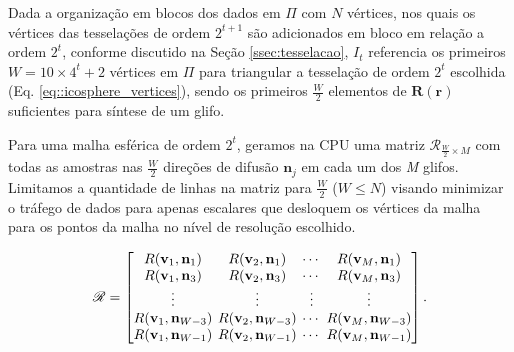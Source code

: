 Dada a organização em blocos dos dados em $\Pi$ com $N$ vértices, nos quais os vértices das tesselações de ordem $2^{t+1}$ são adicionados em bloco em relação a ordem $2^t$, conforme discutido na Seção \ref{ssec:tesselacao}, $I_t$ referencia os primeiros $W = 10 \times 4^t + 2$ vértices em $\Pi$ para triangular a tesselação de ordem $2^t$ escolhida (Eq. \ref{eq::icosphere_vertices}), sendo os primeiros $\frac{W}{2}$ elementos de $\boldsymbol{R}(\mathbf{r})$ suficientes para síntese de um glifo.

Para uma malha esférica de ordem $2^t$, geramos na CPU uma matriz $\boldsymbol{\mathscr{R}}_{\frac{W}{2} \times M}$ com todas as amostras nas $\frac{W}{2}$ direções de difusão $\mathbf{n}_j$ em cada um dos \textit{M} glifos. Limitamos a quantidade de linhas na matriz para $\frac{W}{2}$ ($W \leq N$) visando minimizar o tráfego de dados para apenas escalares que desloquem os vértices da malha para os pontos da malha no nível de resolução escolhido.


\begin{equation}
\label{eq::R}
\boldsymbol{\mathscr{R}} = 
\begingroup %
\setlength\arraycolsep{2pt}
\begin{bmatrix} 
    R(\mathbf{v}_{1}, \mathbf{n}_1) &
    R(\mathbf{v}_{2}, \mathbf{n}_1) & \cdots & 
    R(\mathbf{v}_{M}, \mathbf{n}_1)  \\
    
    R(\mathbf{v}_{1}, \mathbf{n}_3) &
    R(\mathbf{v}_{2}, \mathbf{n}_3) & \cdots & 
    R(\mathbf{v}_{M}, \mathbf{n}_{3}) \\ \vdots & \vdots & \vdots & \vdots  \\
    
    R(\mathbf{v}_{1}, \mathbf{n}_{W-3}) &
    R(\mathbf{v}_{2}, \mathbf{n}_{W-3}) & \cdots & 
    R(\mathbf{v}_{M}, \mathbf{n}_{W-3})  \\
    
    R(\mathbf{v}_{1}, \mathbf{n}_{W-1}) & 
    R(\mathbf{v}_{2}, \mathbf{n}_{W-1}) & \cdots & 
    R(\mathbf{v}_{M}, \mathbf{n}_{W-1})
\end{bmatrix}.
\endgroup
\end{equation}

